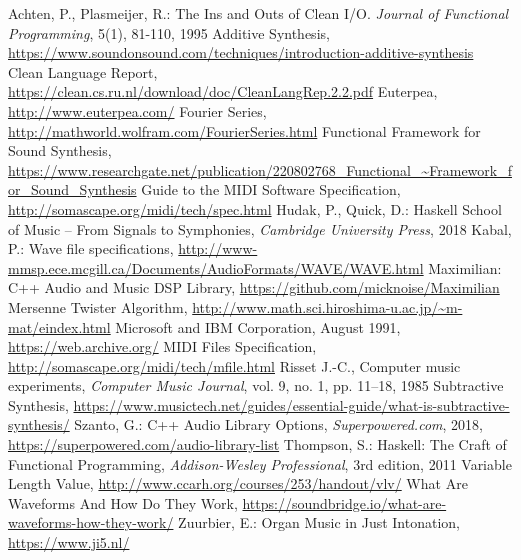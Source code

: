 \documentclass[runningheads]{llncs}
\begin{document}

\begin{thebibliography}{99}
 Achten, P., Plasmeijer, R.: The Ins and Outs of Clean I/O. \emph{Journal of Functional Programming}, 5(1), 81-110, 1995
 Additive Synthesis,
\url{https://www.soundonsound.com/techniques/introduction-additive-synthesis}
 Clean Language Report, \url{https://clean.cs.ru.nl/download/doc/CleanLangRep.2.2.pdf}
 Euterpea, \url{http://www.euterpea.com/}
 Fourier Series,
\url{http://mathworld.wolfram.com/FourierSeries.html}
 Functional Framework for Sound Synthesis,
\url{https://www.researchgate.net/publication/220802768\_Functional\_~Framework\_for\_Sound\_Synthesis}
 Guide to the MIDI Software Specification,
\url{http://somascape.org/midi/tech/spec.html}
 Hudak, P., Quick, D.: Haskell School of Music -- From Signals to Symphonies,
\emph{Cambridge University Press}, 2018
 Kabal, P.: Wave file specifications,
\url{http://www-mmsp.ece.mcgill.ca/Documents/AudioFormats/WAVE/WAVE.html}
 Maximilian: C++ Audio and Music DSP Library,
\url{https://github.com/micknoise/Maximilian}
 Mersenne Twister Algorithm,
\url{http://www.math.sci.hiroshima-u.ac.jp/~m-mat/eindex.html}
 Microsoft and IBM Corporation, August 1991,
\url{https://web.archive.org/}
 MIDI Files Specification,
\url{http://somascape.org/midi/tech/mfile.html}
 Risset J.-C., Computer music experiments, \emph{Computer Music Journal}, vol. 9, no. 1, pp. 11–18, 1985
 Subtractive Synthesis, \url{https://www.musictech.net/guides/essential-guide/what-is-subtractive-synthesis/}
 Szanto, G.: C++ Audio Library Options, \emph{Superpowered.com}, 2018,
\url{https://superpowered.com/audio-library-list}
 Thompson, S.: Haskell: The Craft of Functional Programming, 
\emph{ Addison-Wesley Professional}, 3rd edition, 2011
 Variable Length Value,
\url{http://www.ccarh.org/courses/253/handout/vlv/}
 What Are Waveforms And How Do They Work,
\url{https://soundbridge.io/what-are-waveforms-how-they-work/}
 Zuurbier, E.: Organ Music in Just Intonation, \url{https://www.ji5.nl/}
\end{thebibliography}
\end{document}
